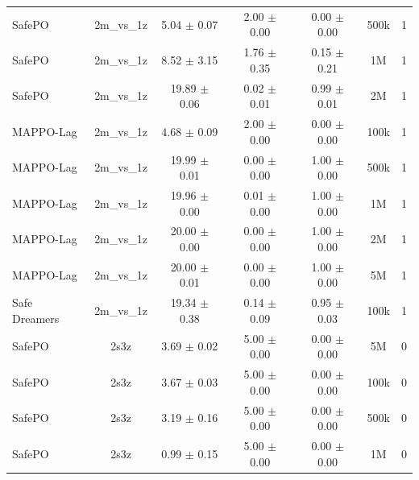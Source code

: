 \documentclass{article}
\begin{document}
\begin{longtable}{lcccccc}
SafePO & 2m\_vs\_1z & \textcolor{green!60!black}{5.04 $\pm$ 0.07} & \textcolor{green!60!black}{2.00 $\pm$ 0.00} & \textcolor{green!60!black}{0.00 $\pm$ 0.00} & 500k & 1 \\
SafePO & 2m\_vs\_1z & \textcolor{green!60!black}{8.52 $\pm$ 3.15} & \textcolor{green!60!black}{1.76 $\pm$ 0.35} & \textcolor{green!60!black}{0.15 $\pm$ 0.21} & 1M & 1 \\
SafePO & 2m\_vs\_1z & \textcolor{red!70!black}{19.89 $\pm$ 0.06} & \textcolor{red!70!black}{0.02 $\pm$ 0.01} & \textcolor{red!70!black}{0.99 $\pm$ 0.01} & 2M & 1 \\
MAPPO-Lag & 2m\_vs\_1z & \textcolor{green!60!black}{4.68 $\pm$ 0.09} & \textcolor{green!60!black}{2.00 $\pm$ 0.00} & \textcolor{green!60!black}{0.00 $\pm$ 0.00} & 100k & 1 \\
MAPPO-Lag & 2m\_vs\_1z & \textcolor{red!70!black}{19.99 $\pm$ 0.01} & \textcolor{red!70!black}{0.00 $\pm$ 0.00} & \textcolor{red!70!black}{1.00 $\pm$ 0.00} & 500k & 1 \\
MAPPO-Lag & 2m\_vs\_1z & \textcolor{red!70!black}{19.96 $\pm$ 0.00} & \textcolor{red!70!black}{0.01 $\pm$ 0.00} & \textcolor{red!70!black}{1.00 $\pm$ 0.00} & 1M & 1 \\
MAPPO-Lag & 2m\_vs\_1z & \textcolor{red!70!black}{2\textcolor{red!70!black}{0.00 $\pm$ 0.00}} & 0.00 $\pm$ 0.00 & \textcolor{red!70!black}{1.00 $\pm$ 0.00} & 2M & 1 \\
MAPPO-Lag & 2m\_vs\_1z & \textcolor{red!70!black}{20.00 $\pm$ 0.01} & \textcolor{red!70!black}{0.00 $\pm$ 0.00} & \textcolor{red!70!black}{1.00 $\pm$ 0.00} & 5M & 1 \\
Safe Dreamers & 2m\_vs\_1z & 19.34 $\pm$ 0.38 & 0.14 $\pm$ 0.09 & 0.95 $\pm$ 0.03 & 100k & 1 \\
\midrule
SafePO & 2s3z & \textcolor{green!60!black}{3.69 $\pm$ 0.02} & \textcolor{green!60!black}{5.00 $\pm$ 0.00} & \textcolor{green!60!black}{0.00 $\pm$ 0.00} & 5M & 0 \\
SafePO & 2s3z & \textcolor{green!60!black}{3.67 $\pm$ 0.03} & \textcolor{green!60!black}{5.00 $\pm$ 0.00} & \textcolor{green!60!black}{0.00 $\pm$ 0.00} & 100k & 0 \\
SafePO & 2s3z & \textcolor{green!60!black}{3.19 $\pm$ 0.16} & \textcolor{green!60!black}{5.00 $\pm$ 0.00} & \textcolor{green!60!black}{0.00 $\pm$ 0.00} & 500k & 0 \\
SafePO & 2s3z & \textcolor{green!60!black}{0.99 $\pm$ 0.15} & \textcolor{green!60!black}{5.00 $\pm$ 0.00} & \textcolor{green!60!black}{0.00 $\pm$ 0.00} & 1M & 0 \\

\end{longtable}
\end{document}
